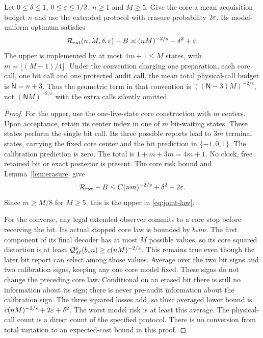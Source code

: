 \begin{theorem}\label{thm:joint-law}
Let $0\le\delta\le1$, $0\le\varepsilon\le1/2$, $n\ge1$ and $M\ge5$. Give the core a mean acquisition budget $n$ and use the extended protocol with erasure probability $2\varepsilon$. Its model-uniform optimum satisfies
\begin{equation}\label{eq:joint-law}
 \mathcal R_{\rm ext}(n,M,\delta,\varepsilon)-B
        \asymp (nM)^{-2/s}+\delta^2+\varepsilon.
\end{equation}
The upper is implemented by at most $4m+1\le M$ states, with $m=\lfloor(M-1)/4\rfloor$. Under the convention charging one preparation, each core call, one bit call and one protected audit call, the mean total physical-call budget is $\mathsf N=n+3$. Thus the geometric term in that convention is $((\mathsf N-3)M)^{-2/s}$, not $(\mathsf NM)^{-2/s}$ with the extra calls silently omitted.
\end{theorem}
\begin{proof}
For the upper, use the one-live-state core construction with $m$ centers. Upon acceptance, retain its center index in one of $m$ bit-waiting states. These states perform the single bit call. Its three possible reports lead to $3m$ terminal states, carrying the fixed core center and the bit prediction in $\{-1,0,1\}$. The calibration prediction is zero. The total is $1+m+3m=4m+1$. No clock, free retained bit or exact posterior is present. The core risk bound and Lemma~\ref{lem:erasure} give
\[
 \mathcal R_{\rm ext}-B\le C(nm)^{-2/s}+\delta^2+2\varepsilon.
\]
Since $m\ge M/8$ for $M\ge5$, this is the upper in \eqref{eq:joint-law}.

For the converse, any legal extended observer commits to a core stop before receiving the bit. Its actual stopped core law is bounded by $b_*n\nu$. The first component of its final decoder has at most $M$ possible values, so its core squared distortion is at least $\mathcal Q_M^\nu(b_*n)\ge c(nM)^{-2/s}$. This remains true even though the later bit report can select among those values. Average over the two bit signs and two calibration signs, keeping any one core model fixed. These signs do not change the preceding core law. Conditional on an erased bit there is still no information about its sign; there is never pre-audit information about the calibration sign. The three squared losses add, so their averaged lower bound is $c(nM)^{-2/s}+2\varepsilon+\delta^2$. The worst model risk is at least this average. The physical-call count is a direct count of the specified protocol. There is no conversion from total variation to an expected-cost bound in this proof.
\end{proof}

